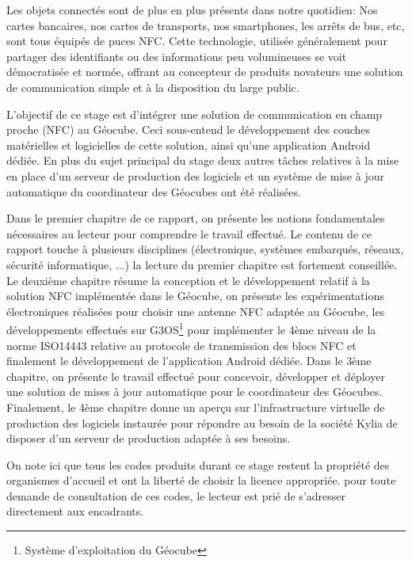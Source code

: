\documentclass{themeensg}
\begin{document}
  \vspace{1.5cm}
  
	Les objets connectés sont de plus en plus présents dans notre quotidien: Nos cartes bancaires, nos cartes de transports, nos smartphones, les arrêts de bus, etc, sont tous équipés de puces NFC. Cette technologie, utilisée généralement pour partager des identifiants ou des informations peu volumineuses se voit démocratisée et normée, offrant au concepteur de produits novateurs une solution de communication simple et à la disposition du large public.
	
	L'objectif de ce stage est d'intégrer une solution de communication en champ proche (NFC) au Géocube. Ceci sous-entend le développement des couches matérielles et logicielles de cette solution, ainsi qu'une application Android dédiée. En plus du sujet principal du stage deux autres tâches relatives à la mise en place d'un serveur de production des logiciels et un système de mise à jour automatique du coordinateur des Géocubes ont été réalisées.
	
	Dans le premier chapitre de ce rapport, on présente les notions fondamentales nécessaires au lecteur pour comprendre le travail effectué. Le contenu de ce rapport touche à plusieurs disciplines (électronique, systèmes embarqués, réseaux, sécurité informatique, ...) la lecture du premier chapitre est fortement conseillée. Le deuxième chapitre résume la conception et le développement relatif à la solution NFC implémentée dans le Géocube, on présente les expérimentations électroniques réalisées pour choisir une antenne NFC adaptée au Géocube, les développements effectués sur G3OS\footnote{Système d'exploitation du Géocube} pour implémenter le 4ème niveau de la norme ISO14443 relative au protocole de transmission des blocs NFC et finalement le développement de l'application Android dédiée. Dans le 3ème chapitre, on présente le travail effectué pour concevoir, développer et déployer une solution de mises à jour automatique pour le coordinateur des Géocubes. Finalement, le 4ème chapitre donne un aperçu sur l'infrastructure virtuelle de production des logiciels instaurée pour répondre au besoin de la société Kylia de disposer d'un serveur de production adaptée à ses besoins.
	
	 On note ici que tous les codes produits durant ce stage restent la propriété des organismes d'accueil et ont la liberté de choisir la licence appropriée. pour toute demande de consultation de ces codes, le lecteur est prié de s'adresser directement aux encadrants.
\end{document}
